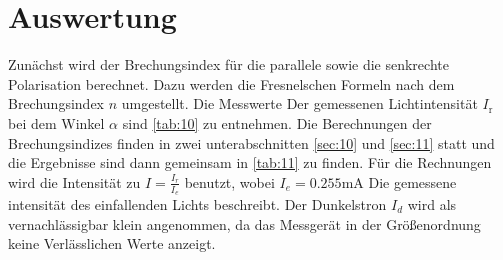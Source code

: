\section{Auswertung}
\label{sec:Auswertung}

Zunächst wird der Brechungsindex für die parallele sowie die senkrechte
Polarisation berechnet. Dazu werden die Fresnelschen Formeln nach dem 
Brechungsindex $n$ umgestellt. Die Messwerte Der gemessenen Lichtintensität $I_\text{r}$
bei dem Winkel $\alpha$ sind \autoref{tab:10}  zu entnehmen. Die Berechnungen der Brechungsindizes 
finden in zwei unterabschnitten \autoref{sec:10} und \autoref{sec:11} statt und die Ergebnisse sind 
dann gemeinsam in \autoref{tab:11} zu finden. Für die Rechnungen wird die Intensität zu $I = \frac{I_r}{I_e}$ 
benutzt, wobei $I_e = 0.255\unit{\milli\ampere}$  Die gemessene intensität des einfallenden Lichts beschreibt.
Der Dunkelstron $I_d$ wird als vernachlässigbar klein angenommen, da das Messgerät in der Größenordnung keine 
Verlässlichen Werte anzeigt.

